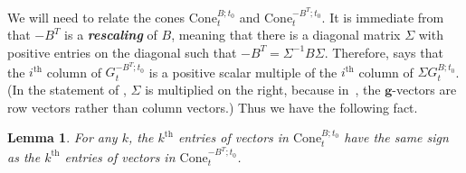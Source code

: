 \documentclass{amsart}
\newtheorem{lemma}[proposition]{Lemma}
\theoremstyle{definition}
\theoremstyle{remark}
\numberwithin{equation}{section}
\newcommand{\newword}[1]{\textbf{\emph{#1}}}
\renewcommand{\th}{^\text{th}}
\newcommand{\0}{{\mathbf{0}}}
\newcommand{\Cone}{\mathrm{Cone}}
\newcommand{\g}{\mathbf{g}}
\renewcommand{\th}{^\text{th}}
\begin{document}
We will need to relate the cones $\Cone^{B;t_0}_t$ and $\Cone^{-B^T;t_0}_t$.
It is immediate from \cite[Proposition~7.5]{universal} that $-B^T$ is a \newword{rescaling} of $B$, meaning that there is a diagonal matrix $\Sigma$ with positive entries on the diagonal such that $-B^T=\Sigma^{-1}B\Sigma$.
Therefore, \cite[Proposition~8.20]{universal} says that the $i\th$ column of $G_t^{-B^T;t_0}$ is a positive scalar multiple of the $i\th$ column of $\Sigma G_t^{B;t_0}$.
(In the statement of \cite[Proposition~8.20]{universal}, $\Sigma$ is multiplied on the right, because in~\cite{universal}, the $\g$-vectors are row vectors rather than column vectors.)
Thus we have the following fact.
\begin{lemma}\label{B or -BT}
For any $k$, the $k\th$ entries of vectors in $\Cone^{B;t_0}_t$ have the same sign as the $k\th$ entries of vectors in $\Cone^{-B^T;t_0}_t$.
\end{lemma}
\end{document}
